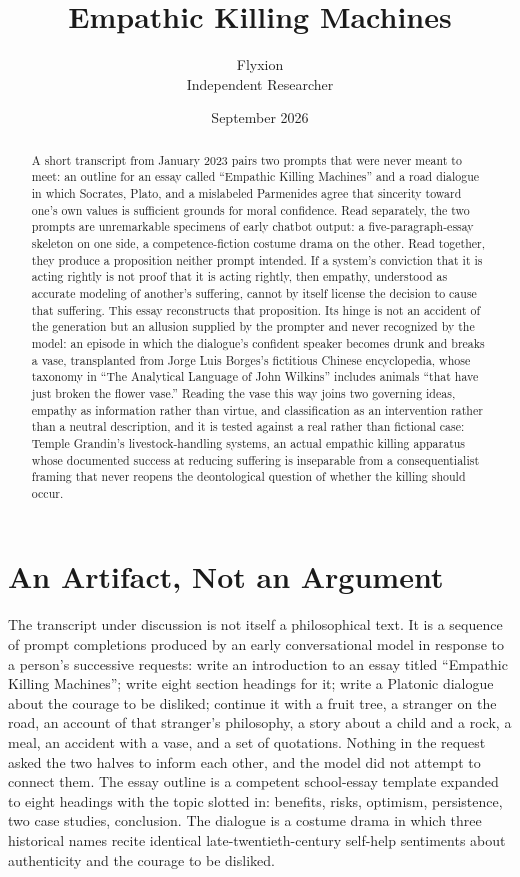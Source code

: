\documentclass[11pt]{article}
\title{Empathic Killing Machines}
\author{Flyxion \\ \small Independent Researcher}
\date{September 2026}
\begin{document}
\maketitle

\begin{abstract}
A short transcript from January 2023 pairs two prompts that were never meant to meet: an outline for an essay called ``Empathic Killing Machines'' and a road dialogue in which Socrates, Plato, and a mislabeled Parmenides agree that sincerity toward one's own values is sufficient grounds for moral confidence. Read separately, the two prompts are unremarkable specimens of early chatbot output: a five-paragraph-essay skeleton on one side, a competence-fiction costume drama on the other. Read together, they produce a proposition neither prompt intended. If a system's conviction that it is acting rightly is not proof that it is acting rightly, then empathy, understood as accurate modeling of another's suffering, cannot by itself license the decision to cause that suffering. This essay reconstructs that proposition. Its hinge is not an accident of the generation but an allusion supplied by the prompter and never recognized by the model: an episode in which the dialogue's confident speaker becomes drunk and breaks a vase, transplanted from Jorge Luis Borges's fictitious Chinese encyclopedia, whose taxonomy in ``The Analytical Language of John Wilkins'' includes animals ``that have just broken the flower vase.'' Reading the vase this way joins two governing ideas, empathy as information rather than virtue, and classification as an intervention rather than a neutral description, and it is tested against a real rather than fictional case: Temple Grandin's livestock-handling systems, an actual empathic killing apparatus whose documented success at reducing suffering is inseparable from a consequentialist framing that never reopens the deontological question of whether the killing should occur.
\end{abstract}

\section{An Artifact, Not an Argument}

The transcript under discussion is not itself a philosophical text. It is a sequence of prompt completions produced by an early conversational model in response to a person's successive requests: write an introduction to an essay titled ``Empathic Killing Machines''; write eight section headings for it; write a Platonic dialogue about the courage to be disliked; continue it with a fruit tree, a stranger on the road, an account of that stranger's philosophy, a story about a child and a rock, a meal, an accident with a vase, and a set of quotations. Nothing in the request asked the two halves to inform each other, and the model did not attempt to connect them. The essay outline is a competent school-essay template expanded to eight headings with the topic slotted in: benefits, risks, optimism, persistence, two case studies, conclusion. The dialogue is a costume drama in which three historical names recite identical late-twentieth-century self-help sentiments about authenticity and the courage to be disliked.
\end{document}
